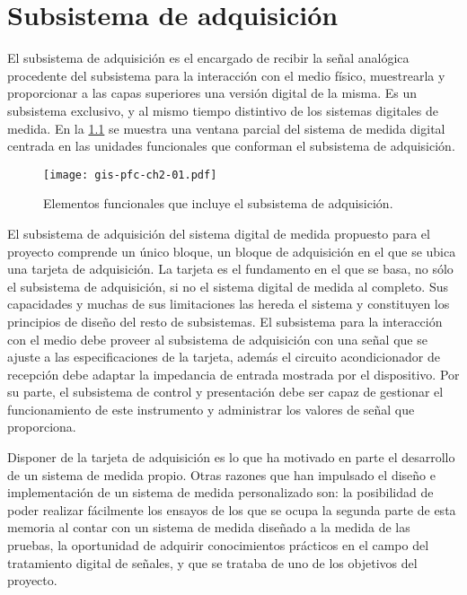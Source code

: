 \chapter{Subsistema de adquisición}\label{chap:acquisition}

El subsistema de adquisición es el encargado de recibir la señal analógica
procedente del subsistema para la interacción con el medio físico,
muestrearla y proporcionar a las capas superiores una versión digital de la
misma. Es un subsistema exclusivo, y al mismo tiempo distintivo de los
sistemas digitales de medida. En la \cref{fig:subacqui} se muestra una
ventana parcial del sistema de medida digital centrada en las unidades
funcionales que conforman el subsistema de adquisición.

\begin{figure}
	\begin{center}
		\texttt{[image: gis-pfc-ch2-01.pdf]}
	\end{center}
	\caption[Subsistema de adquisición] {Elementos funcionales que
	incluye el subsistema de adquisición.}
	\label{fig:subacqui}
\end{figure}

El subsistema de adquisición del sistema digital de medida propuesto para
el proyecto comprende un único bloque, un bloque de adquisición en el que
se ubica una tarjeta de adquisición. La tarjeta \kpci{} es el fundamento en
el que se basa, no sólo el subsistema de adquisición, si no el sistema
digital de medida al completo. Sus capacidades y muchas de sus limitaciones
las hereda el sistema y constituyen los principios de diseño del resto de
subsistemas. El subsistema para la interacción con el medio debe proveer al
subsistema de adquisición con una señal que se ajuste a las
especificaciones de la tarjeta, además el circuito acondicionador de
recepción debe adaptar la impedancia de entrada mostrada por el
dispositivo. Por su parte, el subsistema de control y presentación debe ser
capaz de gestionar el funcionamiento de este instrumento y administrar los
valores de señal que proporciona.

Disponer de la tarjeta de adquisición es lo que ha motivado en parte el
desarrollo de un sistema de medida propio. Otras razones que han impulsado
el diseño e implementación de un sistema de medida personalizado son: la
posibilidad de poder realizar fácilmente los ensayos de los que se ocupa la
segunda parte de esta memoria al contar con un sistema de medida diseñado a
la medida de las pruebas, la oportunidad de adquirir conocimientos
prácticos en el campo del tratamiento digital de señales, y que se trataba
de uno de los objetivos del proyecto.

